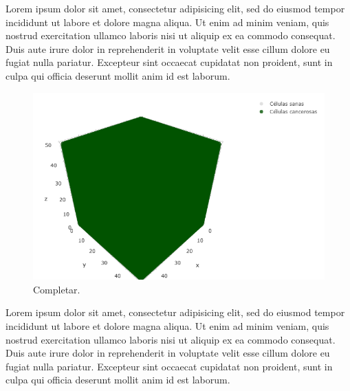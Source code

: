Lorem ipsum dolor sit amet, consectetur adipisicing elit, sed do eiusmod tempor incididunt ut labore et dolore magna aliqua.
Ut enim ad minim veniam, quis nostrud exercitation ullamco laboris nisi ut aliquip ex ea commodo consequat.
Duis aute irure dolor in reprehenderit in voluptate velit esse cillum dolore eu fugiat nulla pariatur.
Excepteur sint occaecat cupidatat non proident, sunt in culpa qui officia deserunt mollit anim id est laborum.

\begin{figure}[h]
\centering
\includegraphics[scale=0.6]{figures/experiments/exp3/grid}
\caption{Completar.}
\end{figure}

Lorem ipsum dolor sit amet, consectetur adipisicing elit, sed do eiusmod tempor incididunt ut labore et dolore magna aliqua.
Ut enim ad minim veniam, quis nostrud exercitation ullamco laboris nisi ut aliquip ex ea commodo consequat.
Duis aute irure dolor in reprehenderit in voluptate velit esse cillum dolore eu fugiat nulla pariatur.
Excepteur sint occaecat cupidatat non proident, sunt in culpa qui officia deserunt mollit anim id est laborum.
